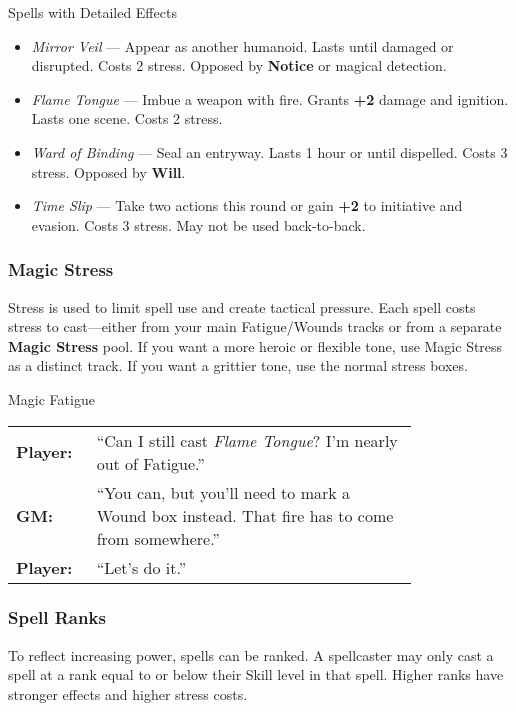 \begin{Example}{Spells with Detailed Effects}
    \begin{itemize}
        \item \textit{Mirror Veil} — Appear as another humanoid. Lasts until damaged or disrupted. Costs 2 stress. Opposed by \textbf{Notice} or magical detection.
        \item \textit{Flame Tongue} — Imbue a weapon with fire. Grants \textbf{+2} damage and ignition. Lasts one scene. Costs 2 stress.
        \item \textit{Ward of Binding} — Seal an entryway. Lasts 1 hour or until dispelled. Costs 3 stress. Opposed by \textbf{Will}.
        \item \textit{Time Slip} — Take two actions this round or gain \textbf{+2} to initiative and evasion. Costs 3 stress. May not be used back-to-back.
    \end{itemize}
\end{Example}

\subsubsection{Magic Stress}

Stress is used to limit spell use and create tactical pressure. Each spell costs stress to cast—either from your main Fatigue/Wounds tracks or from a separate \textbf{Magic Stress} pool. If you want a more heroic or flexible tone, use Magic Stress as a distinct track. If you want a grittier tone, use the normal stress boxes.

\begin{Example}{Magic Fatigue}
    \begin{tabular}{@{}l p{0.8\linewidth}@{}}
        \textbf{Player:} & “Can I still cast \textit{Flame Tongue}? I’m nearly out of Fatigue.” \\
        \textbf{GM:} & “You can, but you’ll need to mark a Wound box instead. That fire has to come from somewhere.” \\
        \textbf{Player:} & “Let’s do it.”  
    \end{tabular}
\end{Example}

\subsubsection{Spell Ranks}

To reflect increasing power, spells can be ranked. A spellcaster may only cast a spell at a rank equal to or below their Skill level in that spell. Higher ranks have stronger effects and higher stress costs.


